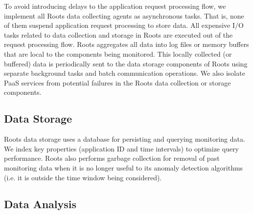 
To avoid introducing delays to the application request processing flow, we implement
all Roots data collecting agents as asynchronous tasks. That is, none of them 
suspend application request processing to store data.
All expensive I/O tasks related to data collection and storage in Roots are
executed out of the request processing flow.
Roots aggregates all data into log files or memory buffers that are local to the components being
monitored. This locally collected (or buffered) data is periodically sent
to the data storage components of Roots using separate background tasks and batch communication
operations. We also isolate PaaS services from potential
failures in the Roots data collection or storage components.

\subsection{Data Storage}

Roots data storage uses a database for persisting and querying monitoring data.
We index key properties (application ID and time intervals) to optimize query performance.
Roots also performs garbage collection for removal of 
past monitoring data when it is no longer useful 
to its anomaly detection algorithms
(i.e. it is outside the time window
being considered). 

\subsection{Data Analysis}

